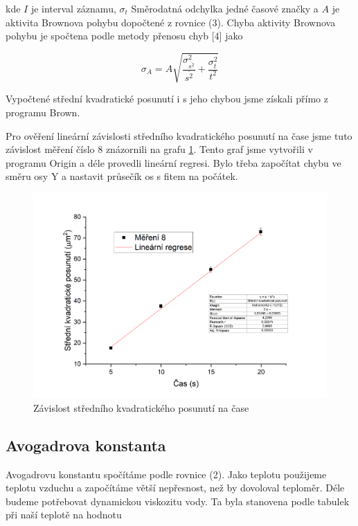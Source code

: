 kde $I$ je interval záznamu, \(\sigma_t\) Směrodatná odchylka jedné časové značky a $A$ je aktivita Brownova pohybu dopočtené z rovnice (3). Chyba aktivity Brownova pohybu je spočtena podle metody přenosu chyb [4] jako

\begin{equation}
    \sigma_A = A \sqrt{\frac{\sigma^2_{\overline{s^2}}}{\overline{s^2}} + \frac{\sigma^2_t}{t^2}}
\end{equation}

Vypočtené střední kvadratické posunutí i s jeho chybou jsme získali přímo z programu Brown.

Pro ověření lineární závislosti středního kvadratického posunutí na čase jsme tuto závislost měření číslo 8 znázornili na grafu \ref{fig:posunuti-na-case}. Tento graf jsme vytvořili v programu Origin a déle provedli lineární regresi. Bylo třeba započítat chybu ve směru osy Y a nastavit průsečík os s fitem na počátek.

\begin{figure}[h]
    \centering
    \includegraphics[width=0.85\linewidth]{16 - Brownův pohyb//Protokol - Brownův pohyb//img/Závislost posunutí na čase.png}
    \caption{Závislost středního kvadratického posunutí na čase}
    \label{fig:posunuti-na-case}
\end{figure}

\newpage
\subsection{Avogadrova konstanta}

Avogadrovu konstantu spočítáme podle rovnice (2). Jako teplotu použijeme teplotu vzduchu a započítáme větší nepřesnost, než by dovoloval teploměr. Déle budeme potřebovat dynamickou viskozitu vody. Ta byla stanovena podle tabulek při naší teplotě na hodnotu

